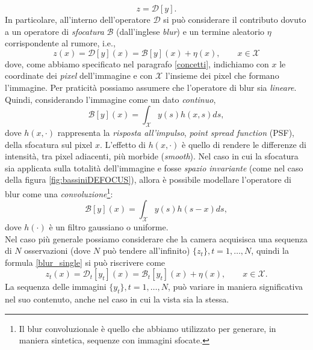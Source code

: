 \begin{equation}
z=\mathcal{D}[y].
\end{equation}
In particolare, all'interno dell'operatore $\mathcal{D}$ si pu\`o considerare il contributo dovuto a un operatore di \textit{sfocatura} $\mathcal{B}$ (dall'inglese \textit{blur}) e un termine aleatorio $\eta$ corrispondente al rumore, i.e.,
\begin{equation}
\label{blur_single}
z(x)=\mathcal{D}[y](x) = \mathcal{B}[y](x) + \eta(x), \qquad x \in \mathcal{X}
\end{equation}
dove, come abbiamo specificato nel paragrafo \ref{concetti}, indichiamo con $x$ le coordinate dei \textit{pixel} dell'immagine e con $\mathcal{X}$ l'insieme dei pixel che formano l'immagine. 
Per praticit\`a possiamo assumere che l'operatore di blur sia \textit{lineare}.
Quindi, considerando l'immagine come un dato \textit{continuo},
\begin{equation}
\label{eq:blur}
\mathcal{B}[y](x) = \int_{\mathcal{X}}y(s)h(x,s)ds,
\end{equation}
dove $h(x,\cdot)$ rappresenta la \textit{risposta all'impulso}, \textit{point spread function} (PSF), della sfocatura sul pixel $x$.
L'effetto di $h(x, \cdot)$ \`e quello di rendere le differenze di intensit\`a, tra pixel adiacenti, pi\`u morbide (\textit{smooth}).
Nel caso in cui la sfocatura sia applicata sulla totalit\`a dell'immagine e fosse \textit{spazio invariante} (come nel caso della figura \ref{fig:bassiniDEFOCUS}), allora \`e possibile modellare l'operatore di blur come una \textit{convoluzione}\footnote{Il blur convoluzionale \`e quello che abbiamo utilizzato per generare, in maniera sintetica, sequenze con immagini sfocate.}:
\begin{equation}
\label{blur_convolution}
\mathcal{B}[y](x) = \int_{\mathcal{X}}y(s)h(s-x)ds,
\end{equation}
dove $h(\cdot)$ \`e un filtro gaussiano o uniforme.\\
Nel caso pi\`u generale possiamo considerare che la camera acquisisca una sequenza di $N$ osservazioni (dove $N$ pu\`o tendere all'infinito) $\{z_t\}, t = 1, \dots ,N$, quindi la formula \eqref{blur_single} si pu\`o riscrivere come
\begin{equation}
\label{blur_multi}
z_t(x)=\mathcal{D}_t[y_t](x) = \mathcal{B}_t[y_t](x) + \eta(x), \qquad x \in \mathcal{X}.
\end{equation}
La sequenza delle immagini $\{y_t\}, t = 1,\dots , N$, pu\`o variare in maniera significativa nel suo contenuto, anche nel caso in cui la vista sia la stessa.
